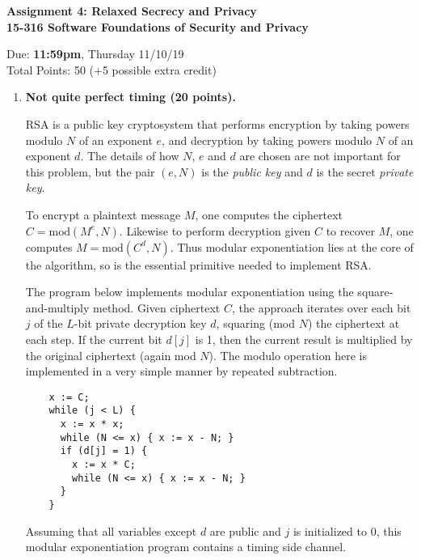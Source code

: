 \documentclass[10pt]{article}
\begin{document}
\begin{center}
\textbf{ Assignment 4: Relaxed Secrecy and Privacy\\15-316 Software Foundations of Security and Privacy}\\
\end{center}
Due: \textbf{ 11:59pm}, Thursday 11/10/19 \\
Total Points: 50 (+5 possible extra credit)

\vspace{-5mm}

\begin{enumerate}

\item \textbf{Not quite perfect timing (20 points).}

RSA is a public key cryptosystem that performs encryption by taking powers modulo $N$ of an exponent $e$, and decryption by taking powers modulo $N$ of an exponent $d$. The details of how $N$, $e$ and $d$ are chosen are not important for this problem, but the pair $(e, N)$ is the \emph{public key} and $d$ is the secret \emph{private key}.

To encrypt a plaintext message $M$, one computes the ciphertext $C = \mathrm{mod}(M^e, N)$. Likewise to perform decryption given $C$ to recover $M$, one computes $M = \mathrm{mod}(C^d, N)$. Thus modular exponentiation lies at the core of the algorithm, so is the essential primitive needed to implement RSA. 

The program below implements modular exponentiation using the square-and-multiply method. Given ciphertext $C$, the approach iterates over each bit $j$ of the $L$-bit private decryption key $d$, squaring (mod $N$) the ciphertext at each step. If the current bit $d[j]$ is 1, then the current result is multiplied by the original ciphertext (again mod $N$). The modulo operation here is implemented in a very simple manner by repeated subtraction.
\begin{lstlisting}
    x := C;
    while (j < L) {
      x := x * x;
      while (N <= x) { x := x - N; }
      if (d[j] = 1) {
        x := x * C;
        while (N <= x) { x := x - N; }
      }
    }
\end{lstlisting}
Assuming that all variables except $d$ are public and $j$ is initialized to 0, this modular exponentiation program contains a timing side channel. 


\end{enumerate}
\end{document}
